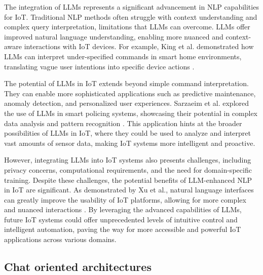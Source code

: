 \documentclass{ieeeaccess}
\begin{document}
The integration of LLMs represents a significant advancement in NLP capabilities for IoT. Traditional NLP methods often struggle with context understanding and complex query interpretation, limitations that LLMs can overcome. LLMs offer improved natural language understanding, enabling more nuanced and context-aware interactions with IoT devices. For example, King et al. demonstrated how LLMs can interpret under-specified commands in smart home environments, translating vague user intentions into specific device actions \cite{10.1145/3643505}.

The potential of LLMs in IoT extends beyond simple command interpretation. They can enable more sophisticated applications such as predictive maintenance, anomaly detection, and personalized user experiences. Sarzaeim et al. explored the use of LLMs in smart policing systems, showcasing their potential in complex data analysis and pattern recognition \cite{10538107}. This application hints at the broader possibilities of LLMs in IoT, where they could be used to analyze and interpret vast amounts of sensor data, making IoT systems more intelligent and proactive.

However, integrating LLMs into IoT systems also presents challenges, including privacy concerns, computational requirements, and the need for domain-specific training. Despite these challenges, the potential benefits of LLM-enhanced NLP in IoT are significant. As demonstrated by Xu et al., natural language interfaces can greatly improve the usability of IoT platforms, allowing for more complex and nuanced interactions \cite{9808139}. By leveraging the advanced capabilities of LLMs, future IoT systems could offer unprecedented levels of intuitive control and intelligent automation, paving the way for more accessible and powerful IoT applications across various domains.

\subsection{Chat oriented architectures}
\end{document}
